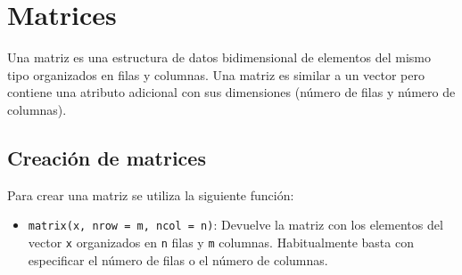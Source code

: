 \documentclass[
  a4paper,
]{scrreport}
\providecommand{\tightlist}{%
  \setlength{\itemsep}{0pt}\setlength{\parskip}{0pt}}\usepackage{longtable,booktabs,array}
\theoremstyle{definition}
\theoremstyle{definition}
\theoremstyle{remark}
\begin{document}
\hypertarget{matrices}{%
\section{Matrices}\label{matrices}}

Una matriz es una estructura de datos bidimensional de elementos del
mismo tipo organizados en filas y columnas. Una matriz es similar a un
vector pero contiene una atributo adicional con sus dimensiones (número
de filas y número de columnas).

\hypertarget{creaciuxf3n-de-matrices}{%
\subsection{Creación de matrices}\label{creaciuxf3n-de-matrices}}

Para crear una matriz se utiliza la siguiente función:

\begin{itemize}
\tightlist
\item
  \texttt{matrix(x,\ nrow\ =\ m,\ ncol\ =\ n)}: Devuelve la matriz con
  los elementos del vector \texttt{x} organizados en \texttt{n} filas y
  \texttt{m} columnas. Habitualmente basta con especificar el número de
  filas o el número de columnas.
\end{itemize}
\end{document}
